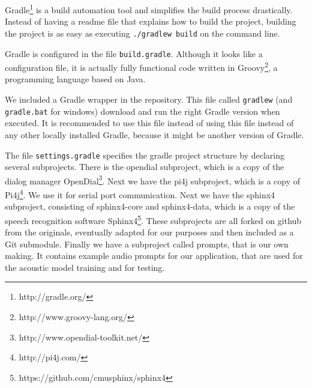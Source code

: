 Gradle\footnote{http://gradle.org/} is a build automation tool and simplifies the build process drastically.
Instead of having a readme file that explains how to build the project, building the project is as easy as executing \texttt{./gradlew build} on the command line.

Gradle is configured in the file \texttt{build.gradle}.
Although it looks like a configuration file, it is actually fully functional code written in Groovy\footnote{http://www.groovy-lang.org/}, a programming language based on Java.

We included a Gradle wrapper in the repository.
This file called \texttt{gradlew} (and \texttt{gradle.bat} for windows) download and run the right Gradle version when executed.
It is recommended to use this file instead of using this file instead of any other locally installed Gradle, because it might be another version of Gradle.

The file \texttt{settings.gradle} specifies the gradle project structure by declaring several subprojects.
There is the opendial subproject, which is a copy of the dialog manager OpenDial\footnote{http://www.opendial-toolkit.net/}.
Next we have the pi4j subproject, which is a copy of Pi4j\footnote{http://pi4j.com/}.
We use it for serial port communication.
Next we have the sphinx4 subproject, consisting of sphinx4-core and sphinx4-data, which is a copy of the speech recognition software Sphinx4\footnote{https://github.com/cmusphinx/sphinx4}.
These subprojects are all forked on github from the originals, eventually adapted for our purposes and then included as a Git submodule.
Finally we have a subproject called prompts, that is our own making.
It contains example audio prompts for our application, that are used for the acoustic model training and for testing.
